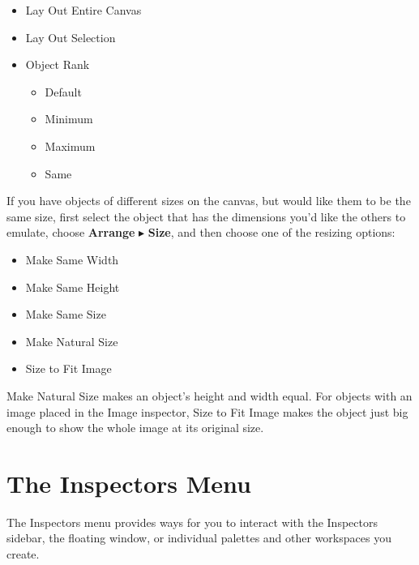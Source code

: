 \documentclass[../main.tex]{subfiles}
\begin{document}
\begin{description}[style=nextline]
      \begin{itemize}
        \item Lay Out Entire Canvas
        \item Lay Out Selection
        \item Object Rank

          \begin{itemize}
            \item Default
            \item Minimum
            \item Maximum
            \item Same
          \end{itemize}
      \end{itemize}
    \item[{Size}] If you have objects of different sizes on the canvas, but would like them to be
      the same size, first select the object that has the dimensions you'd like the others to
      emulate, choose \textbf{Arrange} $\blacktriangleright$ \textbf{Size}, and then choose one of
      the resizing options:

      \begin{itemize}
        \item Make Same Width
        \item Make Same Height
        \item Make Same Size
        \item Make Natural Size
        \item Size to Fit Image
      \end{itemize}
    \item[{}] Make Natural Size makes an object's height and width equal. For objects with an
      image placed in the Image inspector, Size to Fit Image makes the object just big enough to
      show the whole image at its original size.
  \end{description}

  \section{The Inspectors Menu}

  The Inspectors menu provides ways for you to interact with the Inspectors sidebar, the floating
  window, or individual palettes and other workspaces you create.
\end{document}
